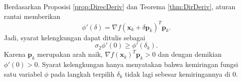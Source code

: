 \begin{remark} Berdasarkan Proposisi \ref{prop:DirecDeriv} dan Teorema \ref{thm:DirDeriv}, aturan rantai memberikan
\begin{displaymath}
\phi'(\delta)=\nabla f(\mathbf{x}_k+\delta\mathbf{p}_k)^T\mathbf{p}_k.
\end{displaymath}
Jadi, syarat kelengkungan dapat ditulis sebagai
\begin{equation}
\sigma_2\phi'(0)\geq\phi'(\delta_k).
\end{equation}
Karena $\mathbf{p}_k$ merupakan arah naik, $\nabla f(\mathbf{x}_k)^T\mathbf{p}_k>0$ dan dengan demikian $\phi'(0)>0$. Syarat kelengkungan hanya menyatakan bahwa kemiringan fungsi satu variabel $\phi$ pada langkah terpilih $\delta_k$ tidak lagi sebesar kemiringannya di $0$.
\end{remark}

